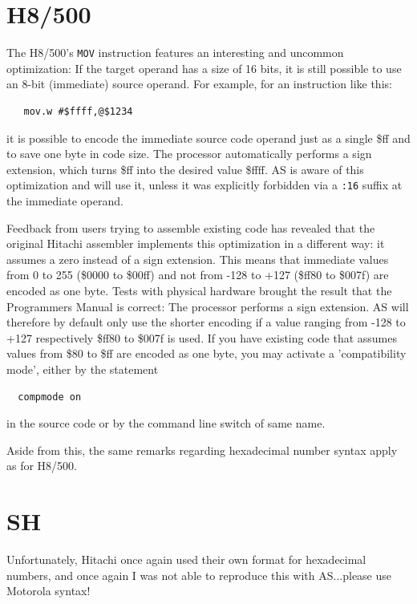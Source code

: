 \documentclass[12pt,twoside]{report}
\newcommand{\tty}[1]{{\tt #1}}
\newcommand{\asname}{{AS}}
\begin{document}
\section{H8/500}

The H8/500's {\tt MOV} instruction features an interesting and uncommon
optimization: If the target operand has a size of 16 bits, it is still possible
to use an 8-bit (immediate) source operand.  For example, for an instruction
like this:
\begin{verbatim}
   mov.w #$ffff,@$1234
\end{verbatim}
it is possible to encode the immediate source code operand just as a single
\$ff and to save one byte in code size.  The processor automatically performs
a sign extension, which turns \$ff into the desired value \$ffff.  \asname{} is aware
of this optimization and will use it, unless it was explicitly forbidden via
a \tty{:16} suffix at the immediate operand.

Feedback from users trying to assemble existing code has revealed that the
original Hitachi assembler implements this optimization in a different way:
it assumes a zero instead of a sign extension.  This means that immediate
values from 0 to 255 (\$0000 to \$00ff) and not from -128 to +127 (\$ff80 to
\$007f) are encoded as one byte.  Tests with physical hardware brought the
result that the Programmers Manual is correct: The processor performs a sign
extension.  \asname{} will therefore by default only use the shorter encoding if 
a value ranging from -128 to +127 respectively \$ff80 to \$007f is used.
If you have existing code that assumes values from \$80 to \$ff are encoded
as one byte, you may activate a 'compatibility mode', either by the
statement
\begin{verbatim}
  compmode on
\end{verbatim}
in the source code or by the command line switch of same name.

Aside from this, the same remarks regarding hexadecimal number syntax apply
as for H8/500.


\section{SH}

Unfortunately, Hitachi once again used their own format for
hexadecimal numbers, and once again I was not able to reproduce this
with \asname{}...please use Motorola syntax!
\end{document}
